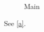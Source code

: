 \documentclass{article}
\begin{document}
\begin{figure}
\caption{Main}
\end{figure}
See \ref{a}.
\end{document}
